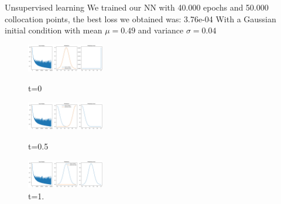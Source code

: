 \begin{frame}{Unsupervised learning}
    We trained our NN with 40.000 epochs and 50.000 collocation points, the best loss we obtained was: 3.76e-04 With a Gaussian initial condition with mean $\mu= 0.49$ and variance $\sigma= 0.04$
    \begin{figure}
        \centering
        \includegraphics[width=0.3\textwidth]{images/nsup1.png}
        \caption{t=0}
        \includegraphics[width=0.3\textwidth]{images/nsup3.png}
        \caption{t=0.5}
        \includegraphics[width=0.3\textwidth]{images/nsup5.png}
        \caption{t=1.}
    \end{figure}

\end{frame}

 